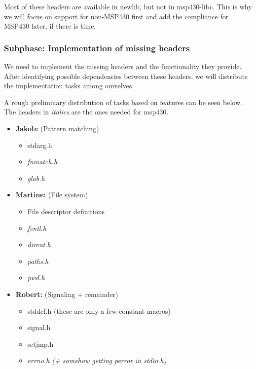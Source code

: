 \documentclass[11pt,
  a4paper,
  BCOR=7mm
]{scrartcl}
\begin{document}
Most of these headers are available in newlib, but not in msp430-libc.
This is why we will focus on support for non-MSP430 first and add the compliance
for MSP430 later, if there is time.

\subsubsection*{Subphase: Implementation of missing headers}
\label{ssub:headers_implementation}
We need to implement the missing headers and the functionality they
provide. After identifying possible dependencies between these headers,
we will distribute the implementation tasks among ourselves.


A rough preliminary distribution of tasks based on features can be seen below. 
The headers in \emph{italics} are the ones needed for msp430.

\begin{itemize}
    \item   \textbf{Jakob:} (Pattern matching)
            \begin{itemize}
                \item   stdarg.h
                \item   \emph{fnmatch.h}
                \item   \emph{glob.h}
            \end{itemize}
    \item   \textbf{Martine:} (File system)
            \begin{itemize}
                \item   File descriptor definitions
                \item   \emph{fcntl.h}
                \item   \emph{dirent.h}
                \item   \emph{paths.h}
                \item   \emph{pwd.h}
            \end{itemize}
    \item   \textbf{Robert:} (Signaling + remainder)
            \begin{itemize}
                \item   stddef.h (these are only a few constant macros)
                \item   signal.h
                \item   setjmp.h
                \item   \emph{errno.h (+ somehow getting perror in stdio.h)}
            \end{itemize}
\end{itemize}
\end{document}

